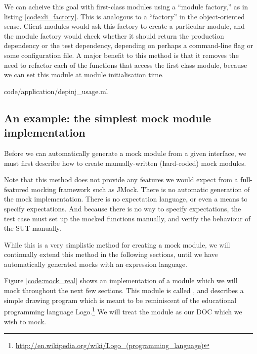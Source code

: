We can acheive this goal with first-class modules using a ``module
factory,'' as in listing \ref{code:di_factory}. This is analogous to a
``factory'' in the object-oriented sense. Client modules would ask
this factory to create a particular module, and the module factory
would check whether it should return the production dependency or the
test dependency, depending on perhaps a command-line flag or some
configuration file. A major benefit to this method is that it removes
the need to refactor each of the functions that access the first class
module, because we can set this module at module initialisation time.

 {code/application/depinj_usage.ml}


\subsection{An example: the simplest mock module implementation}
\label{application:simple}

Before we can automatically generate a mock module from a given
interface, we must first describe how to create manually-written
(hard-coded) mock modules.

Note that this method does not provide any features we would expect
from a full-featured mocking framework such as JMock. There is no
automatic generation of the mock implementation. There is no
expectation language, or even a means to specify expectations. And
because there is no way to specify expectations, the test case must
set up the mocked functions manually, and verify the behaviour of the
SUT manually.

While this is a very simplistic method for creating a mock module, we
will continually extend this method in the following sections, until
we have automatically generated mocks with an expression
language.


Figure \ref{code:mock_real} shows an implementation of a module which
we will mock throughout the next few sections. This module is called
, and describes a simple drawing program which is meant
to be reminiscent of the educational programming language
Logo.\footnote{\url{http://en.wikipedia.org/wiki/Logo_(programming_language)}}
We will treat the  module as our DOC which we wish to
mock.

